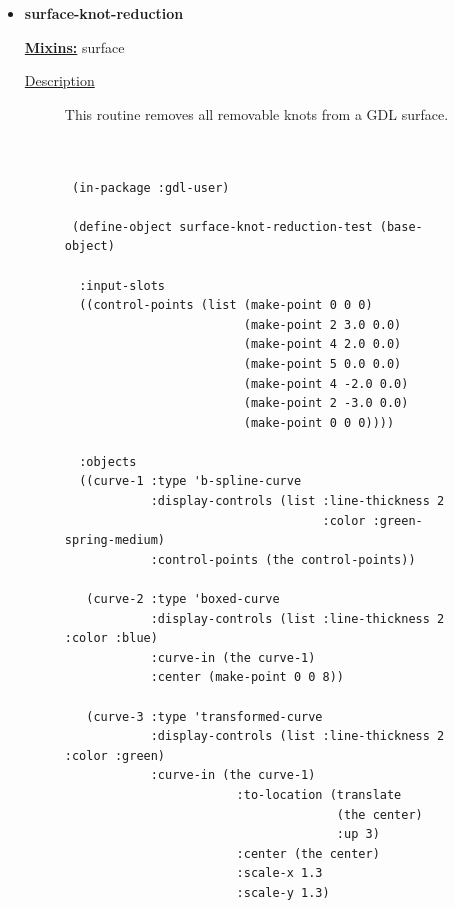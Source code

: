 \documentclass [11pt]{book}
\begin{document}
\begin{itemize}
\item {}
\label{prim:surface-knot-reduction}
\textbf{surface-knot-reduction}


\textbf{
\underline{Mixins:}} surface





\begin{description}

\item [
\underline{Description}]


This routine  removes  all  removable  knots  from a GDL surface.



\end{description}




\begin{figure}
\begin{lrbox}{\boxedverb}
\begin{minipage}{\linewidth}
{\small

\begin{verbatim}

 
 (in-package :gdl-user)

 (define-object surface-knot-reduction-test (base-object) 

  :input-slots
  ((control-points (list (make-point 0 0 0)
                         (make-point 2 3.0 0.0) 
                         (make-point 4 2.0 0.0) 
                         (make-point 5 0.0 0.0) 
                         (make-point 4 -2.0 0.0) 
                         (make-point 2 -3.0 0.0) 
                         (make-point 0 0 0))))

  :objects
  ((curve-1 :type 'b-spline-curve
            :display-controls (list :line-thickness 2 
                                    :color :green-spring-medium)
            :control-points (the control-points))

   (curve-2 :type 'boxed-curve 
            :display-controls (list :line-thickness 2 :color :blue)
            :curve-in (the curve-1)
            :center (make-point 0 0 8))

   (curve-3 :type 'transformed-curve
            :display-controls (list :line-thickness 2 :color :green)
            :curve-in (the curve-1)
                        :to-location (translate 
                                      (the center) 
                                      :up 3)
                        :center (the center)
                        :scale-x 1.3
                        :scale-y 1.3)
   

\end{verbatim}}
\end{minipage}
\end{lrbox}
\end{figure}
\end{itemize}
\end{document}
